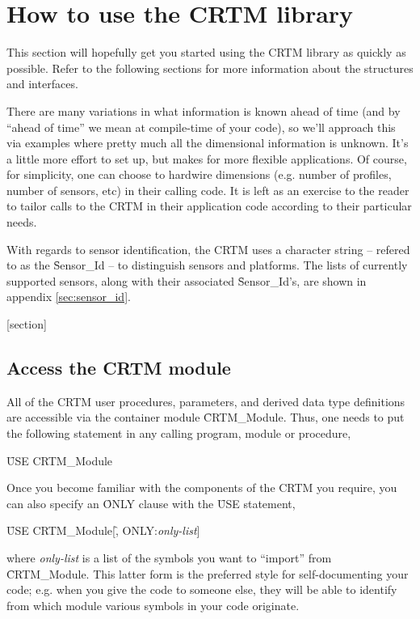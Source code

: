\chapter{How to use the CRTM library}
\label{chapter:use}

This section will hopefully get you started using the CRTM library as quickly as possible. Refer to the following sections for more information about the structures and interfaces.

There are many variations in what information is known ahead of time (and by ``ahead of time'' we mean at compile-time of your code), so we'll approach this via examples where pretty much all the dimensional information is unknown. It's a little more effort to set up, but makes for more flexible applications. Of course, for simplicity, one can choose to hardwire dimensions (e.g. number of profiles, number of sensors, etc) in their calling code. It is left as an exercise to the reader to tailor calls to the CRTM in their application code according to their particular needs.

With regards to sensor identification, the CRTM uses a character string -- refered to as the \f{Sensor\_Id} -- to distinguish sensors and platforms. The lists of currently supported sensors, along with their associated \f{Sensor\_Id}'s, are shown in appendix \ref{sec:sensor_id}.


[section]



\section{Access the CRTM module}
\label{sec:access_step}

All of the CRTM user procedures, parameters, and derived data type definitions are accessible via the container module \f{CRTM\_Module}. Thus, one needs to put the following statement in any calling program, module or procedure,

\qquad\f{USE CRTM\_Module}

Once you become familiar with the components of the CRTM you require, you can also specify an \f{ONLY} clause with the \f{USE} statement,

\qquad\f{USE CRTM\_Module}[\f{, ONLY:}\textit{only-list}]

where \textit{only-list} is a list of the symbols you want to ``import'' from \f{CRTM\_Module}. This latter form is the preferred style for self-documenting your code; e.g. when you give the code to someone else, they will be able to identify from which module various symbols in your code originate.



